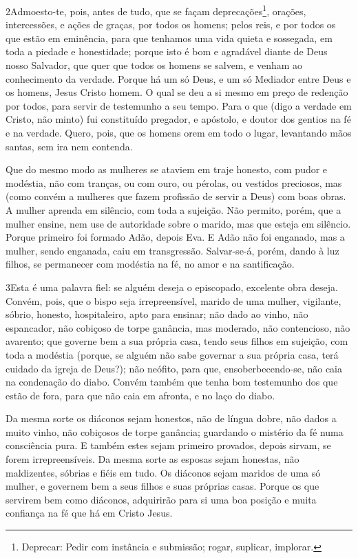 \medskip

\lettrine{2} Admoesto-te, pois, antes de tudo, que se façam
deprecações\footnote{Deprecar: Pedir com instância e submissão;
rogar, suplicar, implorar.}, orações, intercessões, e ações de
graças, por todos os homens; pelos reis, e por todos os que
estão em eminência, para que tenhamos uma vida quieta e sossegada,
em toda a piedade e honestidade; porque isto é bom e agradável
diante de Deus nosso Salvador, que quer que todos os homens se
salvem, e venham ao conhecimento da verdade. Porque há um só
Deus, e um só Mediador entre Deus e os homens, Jesus Cristo homem.
O qual se deu a si mesmo em preço de redenção por todos, para
servir de testemunho a seu tempo. Para o que (digo a verdade em
Cristo, não minto) fui constituído pregador, e apóstolo, e doutor
dos gentios na fé e na verdade. Quero, pois, que os homens orem
em todo o lugar, levantando mãos santas, sem ira nem contenda.

Que do mesmo modo as mulheres se ataviem em traje honesto, com
pudor e modéstia, não com tranças, ou com ouro, ou pérolas, ou
vestidos preciosos, mas (como convém a mulheres que fazem
profissão de servir a Deus) com boas obras. A mulher aprenda
em silêncio, com toda a sujeição. Não permito, porém, que a
mulher ensine, nem use de autoridade sobre o marido, mas que esteja
em silêncio. Porque primeiro foi formado Adão, depois Eva.
E Adão não foi enganado, mas a mulher, sendo enganada, caiu
em transgressão. Salvar-se-á, porém, dando à luz filhos, se
permanecer com modéstia na fé, no amor e na santificação.

\medskip

\lettrine{3} Esta é uma palavra fiel: se alguém deseja o
episcopado, excelente obra deseja. Convém, pois, que o bispo
seja irrepreensível, marido de uma mulher, vigilante, sóbrio,
honesto, hospitaleiro, apto para ensinar; não dado ao vinho, não
espancador, não cobiçoso de torpe ganância, mas moderado, não
contencioso, não avarento; que governe bem a sua própria casa,
tendo seus filhos em sujeição, com toda a modéstia (porque, se
alguém não sabe governar a sua própria casa, terá cuidado da igreja
de Deus?); não neófito, para que, ensoberbecendo-se, não caia na
condenação do diabo. Convém também que tenha bom testemunho dos
que estão de fora, para que não caia em afronta, e no laço do diabo.

Da mesma sorte os diáconos sejam honestos, não de língua dobre,
não dados a muito vinho, não cobiçosos de torpe ganância;
guardando o mistério da fé numa consciência pura. E
também estes sejam primeiro provados, depois sirvam, se forem
irrepreensíveis. Da mesma sorte as esposas sejam honestas,
não maldizentes, sóbrias e fiéis em tudo. Os diáconos sejam
maridos de uma só mulher, e governem bem a seus filhos e suas
próprias casas. Porque os que servirem bem como diáconos,
adquirirão para si uma boa posição e muita confiança na fé que há em
Cristo Jesus.

